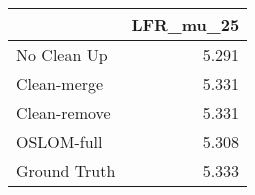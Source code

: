 \begin{tabular}{lr}
\toprule
{} & LFR_mu_25 \\
\midrule
No Clean Up  &     5.291 \\
Clean-merge  &     5.331 \\
Clean-remove &     5.331 \\
OSLOM-full   &     5.308 \\
Ground Truth &     5.333 \\
\bottomrule
\end{tabular}
